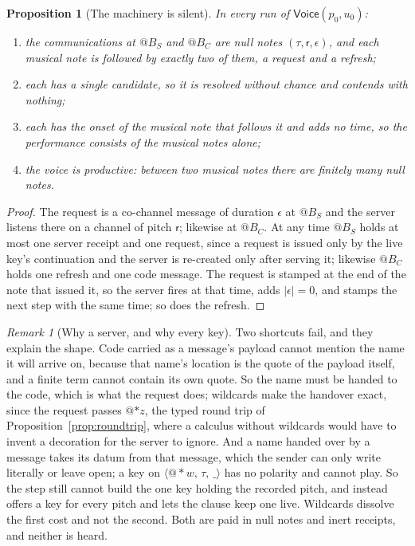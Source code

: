 \documentclass[11pt,a4paper]{article}
\makeatletter
\theoremstyle{plain}
\newtheorem{proposition}[theorem]{Proposition}
\theoremstyle{definition}
\theoremstyle{remark}
\newtheorem{remark}[theorem]{Remark}
\newcommand{\nm}[3]{\langle @#1,\,#2,\,#3\rangle}
\newcommand{\Voice}{\mathsf{Voice}}
\newcommand{\len}[1]{|#1|}
\newcommand{\drop}{{*}}
\newcommand{\nulld}{\epsilon}
\newcommand{\rest}{\mathsf{r}}
\newcommand{\wild}{\_}
\makeatother
\begin{document}
\begin{proposition}[The machinery is silent]\label{prop:silent}
In every run of $\Voice(p_0,u_0)$:
\begin{enumerate}[label=(\roman*),itemsep=1pt]
\item the communications at $@B_S$ and $@B_C$ are null notes
  $(\tau,\rest,\nulld)$, and each musical note is followed by exactly two of
  them, a request and a refresh;
\item each has a single candidate, so it is resolved without chance and
  contends with nothing;
\item each has the onset of the musical note that follows it and adds no time,
  so the performance consists of the musical notes alone;
\item the voice is \emph{productive}: between two musical notes there are
  finitely many null notes.
\end{enumerate}
\end{proposition}
\begin{proof}
The request is a co-channel message of duration $\nulld$ at $@B_S$ and the
server listens there on a channel of pitch $\rest$; likewise at $@B_C$. At any
time $@B_S$ holds at most one server receipt and one request, since a request is
issued only by the live key's continuation and the server is re-created only
after serving it; likewise $@B_C$ holds one refresh and one code message. The
request is stamped at the end of the note that issued it, so the server fires
at that time, adds $\len{\nulld} = 0$, and stamps the next step with the same
time; so does the refresh.
\end{proof}

\begin{remark}[Why a server, and why every key]\label{rem:whyserver}
Two shortcuts fail, and they explain the shape. Code carried as a message's
payload cannot mention the name it will arrive on, because that name's location
is the quote of the payload itself, and a finite term cannot contain its own
quote. So the name must be handed to the code, which is what the request does;
wildcards make the handover exact, since the request passes $@{\drop z}$, the
typed round trip of Proposition~\ref{prop:roundtrip}, where a calculus without
wildcards would have to invent a decoration for the server to ignore. And a name
handed over by a message takes its datum from that message, which the sender can
only write literally or leave open; a key on $\nm{\drop w}{\tau}{\wild}$ has no
polarity and cannot play. So the step still cannot build the one key holding
the recorded pitch, and instead offers a key for every pitch and lets the clause
keep one live. Wildcards dissolve the first cost and not the second. Both are
paid in null notes and inert receipts, and neither is heard.
\end{remark}
\end{document}
